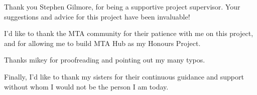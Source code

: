 \begin{acknowledgements}
    Thank you Stephen Gilmore, for being a supportive project supervisor. Your suggestions and advice for this project have been invaluable!


    I'd like to thank the MTA community for their patience with me on this project, and for allowing me to build MTA Hub as my Honours Project.

    Thanks mikey for proofreading and pointing out my many typos.

    Finally, I'd like to thank my sisters for their continuous guidance and support without whom I would not be the person I am today.
\end{acknowledgements}
